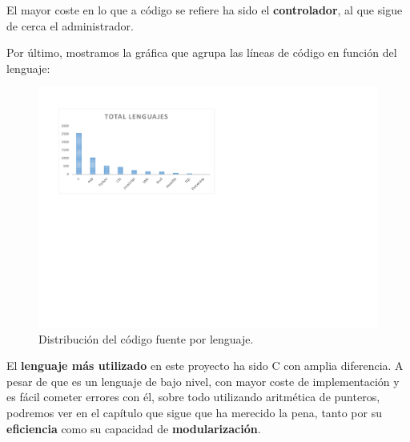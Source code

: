 \smallskip

El mayor coste en lo que a código se refiere ha sido el \textbf{controlador}, al que sigue de cerca el administrador.

Por último, mostramos la gráfica que agrupa las líneas de código en función del lenguaje:

\smallskip

\begin{figure}[H]
	\noindent \begin{centering}
		\includegraphics[clip=true,trim=10 330 400 50,width=\linewidth*3/4]{capitulo5/lineas_lenguajes}
		\par\end{centering}
	\smallskip
	\caption{\label{fig:lineas_lenguajes} Distribución del código fuente por lenguaje.}
\end{figure} 

\smallskip

El \textbf{lenguaje más utilizado} en este proyecto ha sido C con amplia diferencia. A pesar de que es un lenguaje de bajo nivel, con mayor coste de implementación y es fácil cometer errores con él, sobre todo utilizando aritmética de punteros, podremos ver en el capítulo que sigue que ha merecido la pena, tanto por su \textbf{eficiencia} como su capacidad de \textbf{modularización}.

\newpage
\clearpage{\pagestyle{empty}\cleardoublepage}